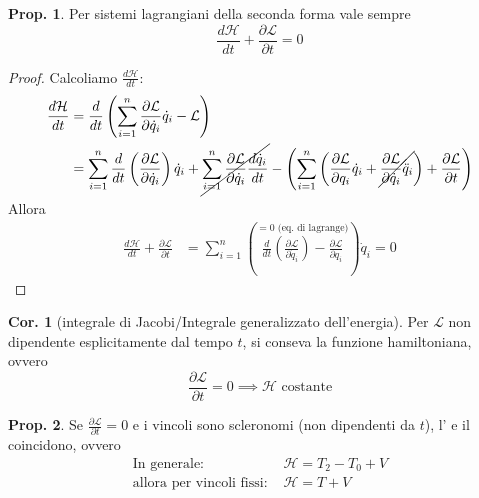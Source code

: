 \documentclass[a4paper,10pt]{article}
\theoremstyle{definition}
\theoremstyle{indentdefinition}
\theoremstyle{indenttheorem}
\newtheorem{prop}{Prop.}
\newtheorem{cor}{Cor.}
\theoremstyle{myremark}
\theoremstyle{indentgeneral}
\newenvironment{myboxed} 
{\noindent\begin{lrbox}{\mybox}\begin{minipage}{\textwidth}}
{\end{minipage}\end{lrbox}\fbox{\usebox{\mybox}}}
\begin{document}
\begin{myboxed}
\begin{prop}
Per sistemi lagrangiani della seconda forma vale sempre $$\frac{d\mathcal{H}}{dt}+\frac{\partial\mathcal{L}}{\partial t}=0$$
\end{prop}
\end{myboxed}

\begin{proof}
Calcoliamo $\frac{d\mathcal{H}}{dt}$:
\begin{align*}
    \frac{d\mathcal{H}}{dt}&=\frac{d}{dt}\left(\sum_{i=1}^n\frac{\partial \mathcal{L}}{\partial\dot{q}_i}\dot{q}_i-\mathcal{L}\right) \\
    &=\sum_{i=1}^n\frac{d}{dt}\left(\frac{\partial \mathcal{L}}{\partial\dot{q}_i}\right)\dot{q}_i+\cancel{\sum_{i=1}^n\frac{\partial \mathcal{L}}{\partial\dot{q}_i}  \frac{d\dot{q}_i}{dt}}-\left( \sum_{i=1}^n\left( \frac{\partial \mathcal{L}}{\partial q_i}\dot{q}_i+\cancel{\frac{\partial \mathcal{L}}{\partial\dot{q}_i}\ddot{q}_i}  \right) +\frac{\partial \mathcal{L}}{\partial t}  \right)
\end{align*}
Allora
\begin{align*}
     \frac{d\mathcal{H}}{dt}+ \frac{\partial\mathcal{L}}{\partial t}&=\sum_{i=1}^n\left( \overset{=0\text{ (eq. di lagrange)}}{\boxed{\frac{d}{dt}\left( \frac{\partial \mathcal{L}}{\partial\dot{q}_i}\right)-\frac{\partial \mathcal{L}}{\partial{q}_i}}}\right)\dot{q}_i  =0
\end{align*}

\end{proof}
\begin{cor}[integrale di Jacobi/Integrale generalizzato dell'energia]
\label{prop:integrale-di-Jacobi}Per $\mathcal{L}$ non dipendente
esplicitamente dal tempo $t$, si conseva la funzione hamiltoniana, ovvero $$\frac{\partial\mathcal{L}}{\partial t}=0\implies \mathcal{H}\text{ costante}$$
\end{cor}

\begin{myboxed}
\begin{prop}
\label{prop:equivalenza-Iacobi-conservazione-energia}Se \textup{$\frac{\partial\mathcal{L}}{\partial t}=0$
e i vincoli sono scleronomi (non dipendenti da $t$), l'
e il  coincidono}, ovvero
\begin{align*}
\text{In generale: } &\mathcal{H}=T_2-T_0+V \\
    \text{allora per vincoli fissi: }&\mathcal{H}=T+V
\end{align*}
\end{prop}
\end{myboxed}
\end{document}
